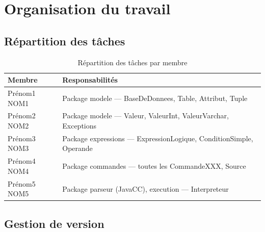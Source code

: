 
\section{Organisation du travail}

\subsection{Répartition des tâches}

\begin{table}[H]
\centering
\begin{tabularx}{\textwidth}{lX}
\toprule
\textbf{Membre} & \textbf{Responsabilités} \\
\midrule
Prénom1 NOM1 & Package modele — BaseDeDonnees, Table, Attribut, Tuple \\
Prénom2 NOM2 & Package modele — Valeur, ValeurInt, ValeurVarchar, Exceptions \\
Prénom3 NOM3 & Package expressions — ExpressionLogique, ConditionSimple, Operande \\
Prénom4 NOM4 & Package commandes — toutes les CommandeXXX, Source \\
Prénom5 NOM5 & Package parseur (JavaCC), execution — Interpreteur \\
\bottomrule
\end{tabularx}
\caption{Répartition des tâches par membre}
\end{table}

\subsection{Gestion de version}
